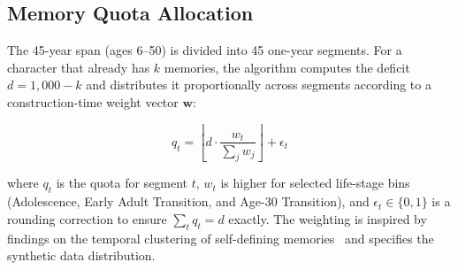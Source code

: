 \documentclass[11pt]{article}
\begin{document}
\subsection{Memory Quota Allocation}
\label{app:stage_b}

The 45-year span (ages 6--50) is divided into 45 one-year segments. For a character that already has $k$ memories, the algorithm computes the deficit $d = 1{,}000 - k$ and distributes it proportionally across segments according to a construction-time weight vector $\mathbf{w}$:

\begin{equation}
  q_t = \left\lfloor d \cdot \frac{w_t}{\sum_j w_j} \right\rfloor + \epsilon_t
\end{equation}

where $q_t$ is the quota for segment $t$, $w_t$ is higher for selected life-stage bins (Adolescence, Early Adult Transition, and Age-30 Transition), and $\epsilon_t \in \{0,1\}$ is a rounding correction to ensure $\sum_t q_t = d$ exactly. The weighting is inspired by findings on the temporal clustering of self-defining memories~\cite{singer1995seeing} and specifies the synthetic data distribution.

\begin{table}[!t]
\centering
\caption{Aggregate memory distribution across age-defined life-stage bins (all 11 characters, $N=11{,}000$).}
\label{tab:stage_dist}

\end{table}
\end{document}
